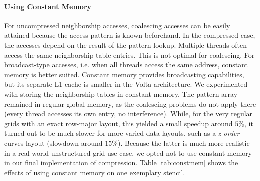 \paragraph{Using Constant Memory} For uncompressed neighborship accesses, coalescing accesses can be easily attained because the access pattern is known beforehand. In the compressed case, the accesses depend on the result of the pattern lookup. Multiple threads often access the same neighborship table entries. This is not optimal for coalescing. For broadcast-type accesses, i.e. when all threads access the same address, constant memory is better suited. Constant memory provides broadcasting capabilities, but its separate L1 cache is smaller in the Volta architecture. We experimented with storing the neighborship tables in constant memory. The pattern array remained in regular global memory, as the coalescing problems do not apply there (every thread accesses its own entry, no interference). While, for the very regular grids with an exact row-major layout, this yielded a small speedup around $5\%$, it turned out to be much slower for more varied data layouts, such as a \emph{z-order} curves layout (slowdown around $15\%$). Because the latter is much more realistic in a real-world unstructured grid use case, we opted not to use constant memory in our final implementation of compression. Table \ref{tab:constmem} shows the effects of using constant memory on one exemplary stencil.

